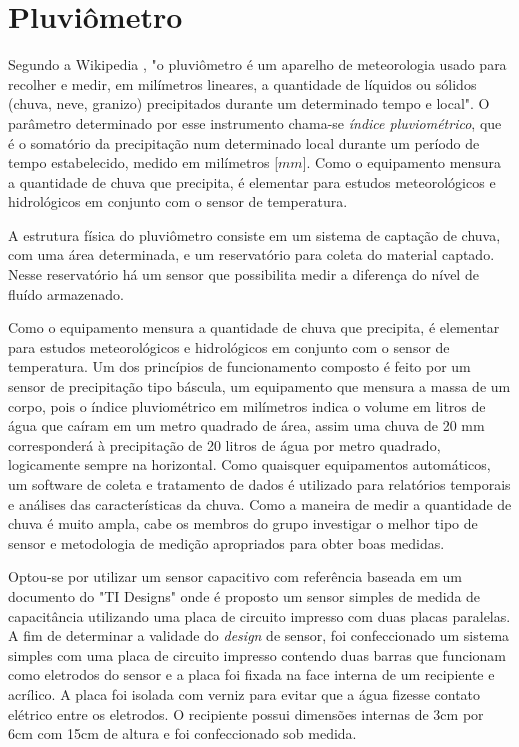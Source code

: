 \documentclass[a4paper]{instrumentacao}
\begin{document}
\section{Pluviômetro}
Segundo a Wikipedia \cite{pluviometro}, "o pluviômetro é um aparelho de meteorologia usado para recolher e medir, em milímetros lineares, a quantidade de líquidos ou sólidos (chuva, neve, granizo) precipitados durante um determinado tempo e local". O parâmetro determinado por esse instrumento chama-se \textit{índice pluviométrico}, que é o somatório da precipitação num determinado local durante um período de tempo estabelecido, medido em milímetros [$mm$]. Como o equipamento mensura a quantidade de chuva que precipita, é elementar para estudos meteorológicos e hidrológicos em conjunto com o sensor de temperatura.

A estrutura física do pluviômetro consiste em um sistema de captação de chuva, com uma área determinada, e um reservatório para coleta do material captado. Nesse reservatório há um sensor que possibilita medir a diferença do nível de fluído armazenado.

Como o equipamento mensura a quantidade de chuva que precipita, é elementar para estudos meteorológicos e hidrológicos em conjunto com o sensor de temperatura. Um dos princípios de funcionamento composto é feito por um sensor de precipitação tipo báscula, um equipamento que mensura a massa de um corpo, pois o índice pluviométrico em milímetros indica o volume em litros de água que caíram em um metro quadrado de área, assim uma chuva de 20 mm corresponderá à precipitação de 20 litros de água por metro quadrado, logicamente sempre na horizontal. Como quaisquer equipamentos automáticos, um software de coleta e tratamento de dados é utilizado para relatórios temporais e análises das características da chuva. Como a maneira de medir a quantidade de chuva é muito ampla, cabe os membros do grupo investigar o melhor tipo de sensor e metodologia de medição apropriados para obter boas medidas. 

Optou-se por utilizar um sensor capacitivo com referência baseada em um documento do "TI Designs"\cite{pluviometro-capacitivo-texas} onde é proposto um sensor simples de medida de capacitância utilizando uma placa de circuito impresso com duas placas paralelas. A fim de determinar a validade do \textit{design} de sensor, foi confeccionado um sistema simples com uma placa de circuito impresso contendo duas barras que funcionam como eletrodos do sensor e a placa foi fixada na face interna de um recipiente e acrílico. A placa foi isolada com verniz para evitar que a água fizesse contato elétrico entre os eletrodos. O recipiente possui dimensões internas de 3cm por 6cm com 15cm de altura e foi confeccionado sob medida.
\end{document}
